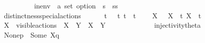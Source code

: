\begin{isabellebody}
\ \ \ \ \ \ {\isacharparenleft}{\kern0pt}{\isacartoucheopen}{\isasymepsilon}{\isacharbrackleft}{\kern0pt}{\isacharunderscore}{\kern0pt}{\isacharbrackright}{\kern0pt}{\isacartoucheclose}{\isacharparenright}{\kern0pt}\ \isanewline
\ \ \ \ \ in{\isacharunderscore}{\kern0pt}env\ {\isacharcolon}{\kern0pt}{\isacharcolon}{\kern0pt}\ {\isacartoucheopen}{\isacharprime}{\kern0pt}a\ set\ option\ {\isasymRightarrow}\ {\isacharprime}{\kern0pt}s\ {\isasymRightarrow}\ {\isacharprime}{\kern0pt}ss{\isacartoucheclose}\ \isanewline
\ \ \ \ \ \ {\isacharparenleft}{\kern0pt}{\isacartoucheopen}{\isasymtheta}{\isacharquery}{\kern0pt}{\isacharbrackleft}{\kern0pt}{\isacharunderscore}{\kern0pt}{\isacharbrackright}{\kern0pt}{\isacharprime}{\kern0pt}{\isacharparenleft}{\kern0pt}{\isacharunderscore}{\kern0pt}{\isacharprime}{\kern0pt}{\isacharparenright}{\kern0pt}{\isacartoucheclose}{\isacharparenright}{\kern0pt}\isanewline
\ \ \isanewline
\ \ \ \ distinctness{\isacharunderscore}{\kern0pt}special{\isacharunderscore}{\kern0pt}actions{\isacharcolon}{\kern0pt}\isanewline
\ \ \ \ {\isacartoucheopen}{\isasymtau}\ {\isasymnoteq}\ t{\isacartoucheclose}\ {\isacartoucheopen}{\isasymtau}\ {\isasymnoteq}\ t{\isacharunderscore}{\kern0pt}{\isasymepsilon}{\isacartoucheclose}\ {\isacartoucheopen}t\ {\isasymnoteq}\ t{\isacharunderscore}{\kern0pt}{\isasymepsilon}{\isacartoucheclose}\isanewline
\ \ \ \ {\isacartoucheopen}{\isasymepsilon}{\isacharbrackleft}{\kern0pt}X{\isacharbrackright}{\kern0pt}\ {\isasymnoteq}\ {\isasymtau}{\isacartoucheclose}\ {\isacartoucheopen}{\isasymepsilon}{\isacharbrackleft}{\kern0pt}X{\isacharbrackright}{\kern0pt}\ {\isasymnoteq}\ t{\isacartoucheclose}\ {\isacartoucheopen}{\isasymepsilon}{\isacharbrackleft}{\kern0pt}X{\isacharbrackright}{\kern0pt}\ {\isasymnoteq}\ t{\isacharunderscore}{\kern0pt}{\isasymepsilon}{\isacartoucheclose}\ \isanewline
\ \ \ \ {\isacartoucheopen}X\ {\isasymsubseteq}\ visible{\isacharunderscore}{\kern0pt}actions\ {\isasymLongrightarrow}\ {\isasymepsilon}{\isacharbrackleft}{\kern0pt}X{\isacharbrackright}{\kern0pt}\ {\isacharequal}{\kern0pt}\ {\isasymepsilon}{\isacharbrackleft}{\kern0pt}Y{\isacharbrackright}{\kern0pt}\ {\isasymLongrightarrow}\ X\ {\isacharequal}{\kern0pt}\ Y{\isacartoucheclose}\isanewline
\ \ \ \ \isanewline
\ \ \ \ \isanewline
\ \ \ \ injectivity{\isacharunderscore}{\kern0pt}theta{\isacharcolon}{\kern0pt}\isanewline
\ \ \ \ {\isacartoucheopen}{\isasymtheta}{\isacharquery}{\kern0pt}{\isacharbrackleft}{\kern0pt}None{\isacharbrackright}{\kern0pt}{\isacharparenleft}{\kern0pt}p{\isacharparenright}{\kern0pt}\ {\isasymnoteq}\ {\isasymtheta}{\isacharquery}{\kern0pt}{\isacharbrackleft}{\kern0pt}Some\ X{\isacharbrackright}{\kern0pt}{\isacharparenleft}{\kern0pt}q{\isacharparenright}{\kern0pt}{\isacartoucheclose}\isanewline

\end{isabellebody}
